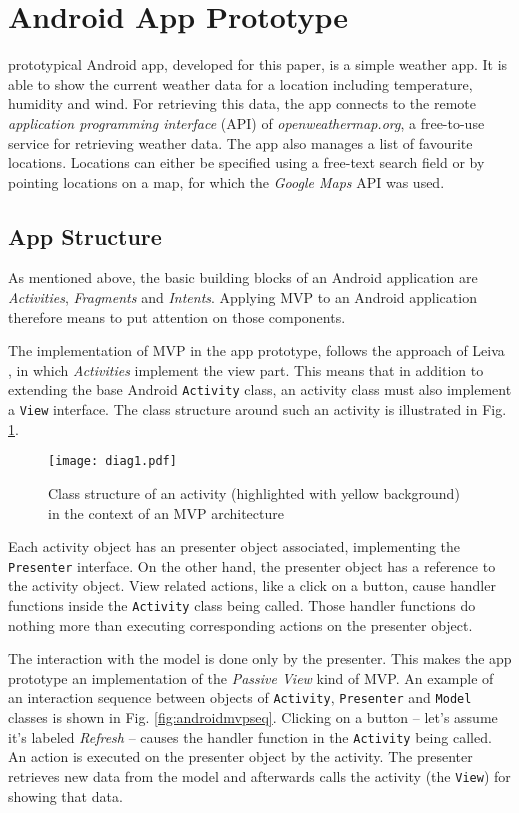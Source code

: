 
\section{Android App Prototype}

 prototypical Android app, developed for this paper, is a simple weather app. It is able to show the current weather data for a location including temperature, humidity and wind. For retrieving this data, the app connects to the remote \emph{application programming interface} (API) of \emph{openweathermap.org}, a free-to-use service for retrieving weather data. The app also manages a list of favourite locations. Locations can either be specified using a free-text search field or by pointing locations on a map, for which the \emph{Google Maps} API was used.

\subsection{App Structure}

As mentioned above, the basic building blocks of an Android application are \emph{Activities}, \emph{Fragments} and \emph{Intents}. Applying MVP to an Android application therefore means to put attention on those components.

The implementation of MVP in the app prototype, follows the approach of Leiva \cite{AntLeiv14}, in which \emph{Activities} implement the view part. This means that in addition to extending the base Android \texttt{Activity} class, an activity class must also implement a \texttt{View} interface. The class structure around such an activity is illustrated in Fig. \ref{fig:androidmvp}.

\begin{figure}[h]
\centering
\texttt{[image: diag1.pdf]}
\caption{Class structure of an activity (highlighted with yellow background) in the context of an MVP architecture}
\label{fig:androidmvp}
\end{figure}

Each activity object has an presenter object associated, implementing the \texttt{Presenter} interface. On the other hand, the presenter object has a reference to the activity object. View related actions, like a click on a button, cause handler functions inside the \texttt{Activity} class being called. Those handler functions do nothing more than executing corresponding actions on the presenter object.

The interaction with the model is done only by the presenter. This makes the app prototype an implementation of the \emph{Passive View} kind of MVP.
An example of an interaction sequence between objects of \texttt{Activity}, \texttt{Presenter} and \texttt{Model} classes is shown in Fig. \ref{fig:androidmvpseq}. Clicking on a button -- let's assume it's labeled \emph{Refresh} -- causes the handler function in the \texttt{Activity} being called. An action is executed on the presenter object by the activity. The presenter retrieves new data from the model and afterwards calls the activity (the \texttt{View}) for showing that data.

